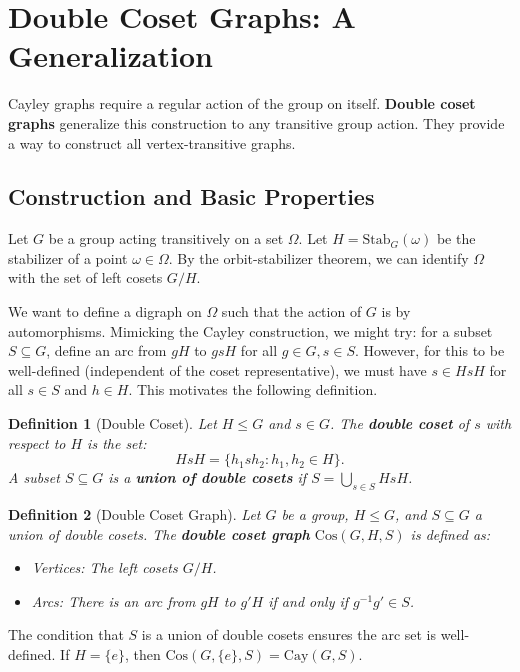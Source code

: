 \documentclass[12pt,a4paper,openany]{book}
\newtheorem{definition}{Definition}[section]
\begin{document}
\section{Double Coset Graphs: A Generalization}

Cayley graphs require a regular action of the group on itself. \textbf{Double coset graphs} generalize this construction to any transitive group action. They provide a way to construct all vertex-transitive graphs.

\subsection{Construction and Basic Properties}

Let $G$ be a group acting transitively on a set $\Omega$. Let $H = \mathrm{Stab}_G(\omega)$ be the stabilizer of a point $\omega \in \Omega$. By the orbit-stabilizer theorem, we can identify $\Omega$ with the set of left cosets $G/H$.

We want to define a digraph on $\Omega$ such that the action of $G$ is by automorphisms. Mimicking the Cayley construction, we might try: for a subset $S \subseteq G$, define an arc from $gH$ to $gsH$ for all $g \in G, s \in S$. However, for this to be well-defined (independent of the coset representative), we must have $s \in H s H$ for all $s \in S$ and $h \in H$. This motivates the following definition.

\begin{definition}[Double Coset]
Let $H \le G$ and $s \in G$. The \textbf{double coset} of $s$ with respect to $H$ is the set:
\[
H s H = \{ h_1 s h_2 : h_1, h_2 \in H \}.
\]
A subset $S \subseteq G$ is a \textbf{union of double cosets} if $S = \bigcup_{s \in S} H s H$.
\end{definition}

\begin{definition}[Double Coset Graph]
Let $G$ be a group, $H \le G$, and $S \subseteq G$ a union of double cosets. The \textbf{double coset graph} $\mathrm{Cos}(G, H, S)$ is defined as:
\begin{itemize}
    \item Vertices: The left cosets $G/H$.
    \item Arcs: There is an arc from $gH$ to $g'H$ if and only if $g^{-1}g' \in S$.
\end{itemize}
\end{definition}

The condition that $S$ is a union of double cosets ensures the arc set is well-defined. If $H = \{e\}$, then $\mathrm{Cos}(G, \{e\}, S) = \mathrm{Cay}(G, S)$.
\end{document}
